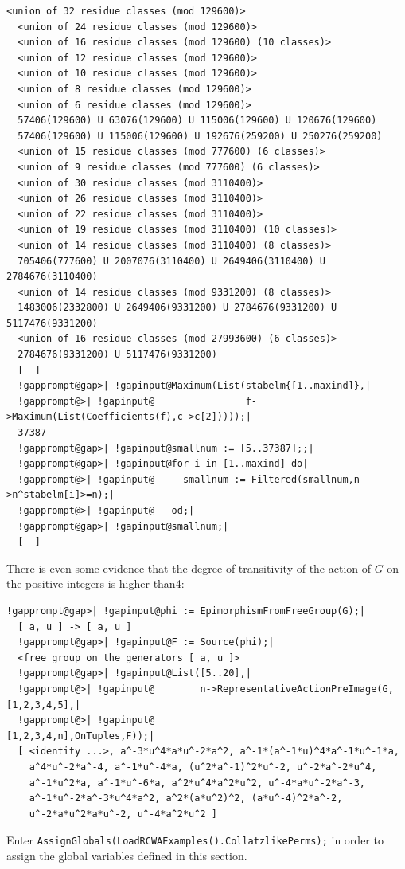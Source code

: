 \documentclass[a4paper,11pt]{report}
\begin{document}
{{\begin{Verbatim}[commandchars=!@|,fontsize=\small,frame=single,label=Example]
  <union of 32 residue classes (mod 129600)>
  <union of 24 residue classes (mod 129600)>
  <union of 16 residue classes (mod 129600) (10 classes)>
  <union of 12 residue classes (mod 129600)>
  <union of 10 residue classes (mod 129600)>
  <union of 8 residue classes (mod 129600)>
  <union of 6 residue classes (mod 129600)>
  57406(129600) U 63076(129600) U 115006(129600) U 120676(129600)
  57406(129600) U 115006(129600) U 192676(259200) U 250276(259200)
  <union of 15 residue classes (mod 777600) (6 classes)>
  <union of 9 residue classes (mod 777600) (6 classes)>
  <union of 30 residue classes (mod 3110400)>
  <union of 26 residue classes (mod 3110400)>
  <union of 22 residue classes (mod 3110400)>
  <union of 19 residue classes (mod 3110400) (10 classes)>
  <union of 14 residue classes (mod 3110400) (8 classes)>
  705406(777600) U 2007076(3110400) U 2649406(3110400) U 2784676(3110400)
  <union of 14 residue classes (mod 9331200) (8 classes)>
  1483006(2332800) U 2649406(9331200) U 2784676(9331200) U 5117476(9331200)
  <union of 16 residue classes (mod 27993600) (6 classes)>
  2784676(9331200) U 5117476(9331200)
  [  ]
  !gapprompt@gap>| !gapinput@Maximum(List(stabelm{[1..maxind]},|
  !gapprompt@>| !gapinput@                f->Maximum(List(Coefficients(f),c->c[2]))));|
  37387
  !gapprompt@gap>| !gapinput@smallnum := [5..37387];;|
  !gapprompt@gap>| !gapinput@for i in [1..maxind] do|
  !gapprompt@>| !gapinput@     smallnum := Filtered(smallnum,n->n^stabelm[i]>=n);|
  !gapprompt@>| !gapinput@   od;|
  !gapprompt@gap>| !gapinput@smallnum;|
  [  ]
\end{Verbatim}
 There is even some evidence that the degree of transitivity of the action of $G$ on the positive integers is higher than{\nobreakspace}4: 
\begin{Verbatim}[commandchars=!@|,fontsize=\small,frame=single,label=Example]
  !gapprompt@gap>| !gapinput@phi := EpimorphismFromFreeGroup(G);|
  [ a, u ] -> [ a, u ]
  !gapprompt@gap>| !gapinput@F := Source(phi);|
  <free group on the generators [ a, u ]>
  !gapprompt@gap>| !gapinput@List([5..20],|
  !gapprompt@>| !gapinput@        n->RepresentativeActionPreImage(G,[1,2,3,4,5],|
  !gapprompt@>| !gapinput@                                          [1,2,3,4,n],OnTuples,F));|
  [ <identity ...>, a^-3*u^4*a*u^-2*a^2, a^-1*(a^-1*u)^4*a^-1*u^-1*a, 
    a^4*u^-2*a^-4, a^-1*u^-4*a, (u^2*a^-1)^2*u^-2, u^-2*a^-2*u^4, 
    a^-1*u^2*a, a^-1*u^-6*a, a^2*u^4*a^2*u^2, u^-4*a*u^-2*a^-3, 
    a^-1*u^-2*a^-3*u^4*a^2, a^2*(a*u^2)^2, (a*u^-4)^2*a^-2, 
    u^-2*a*u^2*a*u^-2, u^-4*a^2*u^2 ]
\end{Verbatim}
 Enter \texttt{AssignGlobals(LoadRCWAExamples().CollatzlikePerms);} in order to assign the global variables defined in this section. }

}
\end{document}
